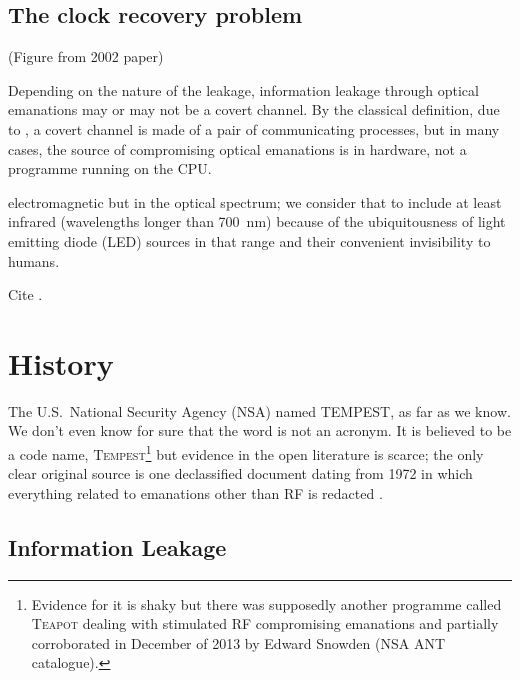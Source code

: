 \documentclass[a4paper,twoside,11pt]{book}
\begin{document}
\subsection{The clock recovery problem}

(Figure from 2002 paper)

Depending on the nature of the leakage, information leakage through optical
emanations may or may not be a covert channel. By the classical definition,
due to \cite{Lampson1973}, a covert channel is made of a pair of communicating
processes, but in many cases, the source of compromising optical emanations
is in hardware, not a programme running on the CPU.

electromagnetic but in the optical spectrum; we consider that to include at
least infrared (wavelengths longer than \SI{700}{\nano\metre}) because of the
ubiquitousness of light emitting diode (LED) sources in that range and their
convenient invisibility to humans.

Cite \cite{Allain2019}.

\section{History}
The U.S.\ National Security Agency (NSA) named TEMPEST, as far as we know. We
don't even know for sure that the word is not an acronym. It is believed to
be a code name, \textsc{Tempest}\footnote{Evidence for it is shaky but there
was supposedly another programme called \textsc{Teapot} dealing with
stimulated RF compromising emanations \cite[p.~539]{Anderson2008a} and
partially corroborated in December of 2013 by Edward Snowden (NSA ANT
catalogue).} but evidence in the open literature is scarce; the only clear
original source is one declassified document dating from 1972 in which
everything related to emanations other than RF is redacted
\cite{NSAtempest2007}.
\subsection{Information Leakage}
\end{document}
